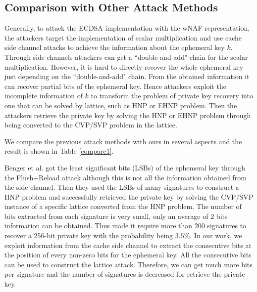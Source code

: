 \subsection{Comparison with Other Attack Methods}
\label{compare}

 Generally,  to attack the ECDSA implementation with the wNAF representation,
   the attackers target the implementation of scalar multiplication
      and use cache side channel attacks to achieve the information about the ephemeral key $k$.
Through side channels attackers can get a ``double-and-add" chain for the scalar multiplication.
However,
 it is hard to directly recover the whole ephemeral key just depending on the ``double-and-add" chain.
From the obtained information it can recover partial bits of the ephemeral key.
Hence attackers exploit the incomplete information of $k$ to transform the problem of private key recovery into one that can be solved by lattice, such as HNP or EHNP problem.
 Then the attackers retrieve the private key by solving the HNP or EHNP problem through being converted to the CVP/SVP problem in the lattice.

We compare the previous attack methods with ours in several aspects and the result is shown in Table \ref{compare1}.

Benger et al. \cite{Benger2014} got the least significant bits (LSBs) of the ephemeral key through the Flush+Reload attack
although this is not all the information obtained from the side channel.
Then they used the LSBs of many signatures to construct a HNP problem and
successfully retrieved the private key by solving the CVP/SVP instance of a specific lattice converted from the HNP problem.
The number of bits extracted from each signature is very small, only an average of 2 bits information can be obtained.
Thus made it require more than $200$ signatures to recover a 256-bit private key with the probability being $3.5\%$.
In our work, we exploit information from the cache side channel to extract the consecutive bits at the position of every non-zero bits for the ephemeral key.
All the consecutive bits can be used to construct the lattice attack.
Therefore, we can get much more bits per signature and the number of signatures is decreased for retrieve the private key.

